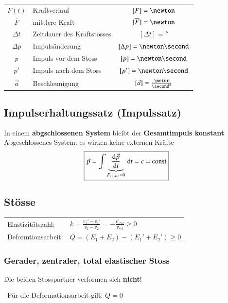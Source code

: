 \begin{tabular}{c l c}
	$F(t)$ 			& Kraftverlauf 					& $[F] = \newton$ 					\\
	$\overline{F}$ 	& mittlere Kraft 				& $[\overline{F}] = \newton$		\\
	$\Delta t$ 		& Zeitdauer des Kraftstosses	& $[\Delta t] = \second$ 			\\
	$\Delta p$ 		& Impulsänderung 				& $[\Delta p] = \newton \second$ 	\\
	$p$ 			& Impuls vor dem Stoss 			& $[p] = \newton \second$ 			\\
	$p'$ 			& Impuls nach dem Stoss 		& $[p'] = \newton \second$ 			\\
	$\vec{a}$ 		& Beschleunigung 				& $[\vec{a}] = \frac{\meter}{\second^2}$
\end{tabular}


\subsection{Impulserhaltungssatz (Impulssatz)}
In einem \textbf{abgschlossenen System} bleibt der \textbf{Gesamtimpuls konstant}
Abgeschlossenes System: es wirken keine externen Kräfte 
$$ \boxed{ \vec{p} =  \int \underbrace{ \frac{\mathop{} \! \mathrm{d} \vec{p}}{\mathop{} \! \mathrm{d} t} }_{\substack{F_{\rm aussen} = 0}}  \, \mathop{} \! \mathrm{d} t = c = \text{const} }  $$


\subsection{Stösse}

\renewcommand{\arraystretch}{2}
\begin{tabular}{ll}
	Elastizitätszahl: 	& $k = \frac{v_2' - v_1'}{v_1 - v_2} = - \frac{v'_{rel}}{v_{rel}} \geq 0$ \\
	Deformtionsarbeit: 	& $Q = (E_1 + E_2) - (E_1' + E_2') \geq 0$ 
\end{tabular}
\renewcommand{\arraystretch}{1.3}

\vspace{0.2cm}



\subsubsection{Gerader, zentraler, total elastischer Stoss}


Die beiden Stosspartner verformen sich \textbf{nicht}!

\textrightarrow\ Für die Deformationsarbeit gilt: $Q = 0$

